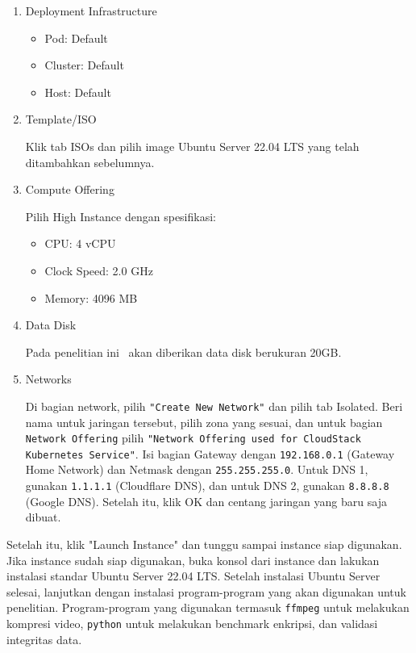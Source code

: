 \begin{enumerate}
    \item Deployment Infrastructure
          \begin{itemize}
              \item Pod: Default
              \item Cluster: Default
              \item Host: Default
          \end{itemize}

    \item Template/ISO

          Klik tab ISOs dan pilih image Ubuntu Server 22.04 LTS yang telah ditambahkan sebelumnya.

    \item Compute Offering

          Pilih High Instance dengan spesifikasi:
          \begin{itemize}
              \item CPU: 4 vCPU
              \item Clock Speed: 2.0 GHz
              \item Memory: 4096 MB
          \end{itemize}

    \item Data Disk

          Pada penelitian ini \vm\ akan diberikan data disk berukuran 20GB.

    \item Networks

          Di bagian network, pilih \texttt{"Create New Network"} dan pilih tab Isolated. Beri nama untuk jaringan tersebut, pilih zona yang sesuai, dan untuk bagian \texttt{Network Offering} pilih \texttt{"Network Offering used for CloudStack Kubernetes Service"}. Isi bagian Gateway dengan \texttt{192.168.0.1} (Gateway Home Network) dan Netmask dengan \texttt{255.255.255.0}. Untuk DNS 1, gunakan \texttt{1.1.1.1} (Cloudflare DNS), dan untuk DNS 2, gunakan \texttt{8.8.8.8} (Google DNS). Setelah itu, klik OK dan centang jaringan yang baru saja dibuat.
\end{enumerate}

Setelah itu, klik "Launch Instance" dan tunggu sampai instance siap digunakan. Jika instance sudah siap digunakan, buka konsol dari instance dan lakukan instalasi standar Ubuntu Server 22.04 LTS. Setelah instalasi Ubuntu Server selesai, lanjutkan dengan instalasi program-program yang akan digunakan untuk penelitian. Program-program yang digunakan termasuk \texttt{ffmpeg} untuk melakukan kompresi video, \texttt{python} untuk melakukan benchmark enkripsi, dan validasi integritas data.

